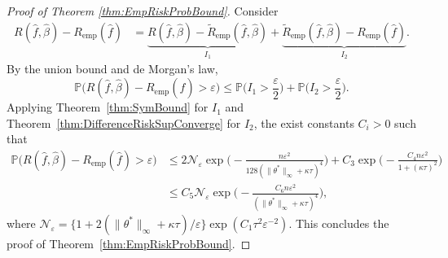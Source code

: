 \documentclass[twoside, onecolumn]{article}
\def\varep{\varepsilon}
\newtheorem{theorem}{Theorem}
\begin{document}

\begin{proof}[Proof of Theorem \ref{thm:EmpRiskProbBound}]
Consider
\begin{align*}
    R(\widehat f, \widehat \beta)-R_{\text{emp}}(\widehat f)&=
      \underbrace{R(\widehat f, \widehat \beta)-\widetilde R_{\text{emp}}(\widehat f, \widehat \beta)}_{I_1}+\underbrace{\widetilde R_{\text{emp}}(\widehat f, \widehat \beta)-R_{\text{emp}}(\widehat f)}_{I_2}.
\end{align*}
By the union bound and de Morgan's law,
$$
\mathbb{P}\Big(  R(\widehat f, \widehat \beta)-R_{\text{emp}}(\widehat f)>\varep\Big)\leq \mathbb{P}\Big(I_{1}>\frac{\varep}{2} \Big)+\mathbb{P}\Big( I_2 >\frac{\varep}{2}\Big).
$$
Applying Theorem~\ref{thm:SymBound} for $I_1$ and Theorem~\ref{thm:DifferenceRiskSupConverge} for $I_2$, the exist constants $C_i > 0$ such that
\begin{align*}
\mathbb{P}\Big(  R(\widehat f, \widehat \beta)-R_{\text{emp}}(\widehat f)>\varep\Big)&\leq 2\mathcal{N}_{\varep}\exp\Big(-  \frac{n\varepsilon^2}{128(\|\theta^*\|_\infty+\kappa \tau)^{4}}\Big)+ C_3 \exp\Big( -\frac{C_4n \varepsilon^2}{1+(\kappa\tau)^2}\Big)\\
&\leq C_5 \mathcal{N}_{\varep}\exp\Big(-\frac{C_6 n \varepsilon^2}{(\|\theta^*\|_\infty+\kappa \tau)^{4}}\Big),
\end{align*}
where $\mathcal{N}_{\varep}=\{1+2(\|\theta^*\|_\infty+\kappa\tau)/\varep\} \exp(C_1\tau^2 \varepsilon^{-2})$.
This concludes the proof of Theorem~\ref{thm:EmpRiskProbBound}. 
\end{proof}
\end{document}
